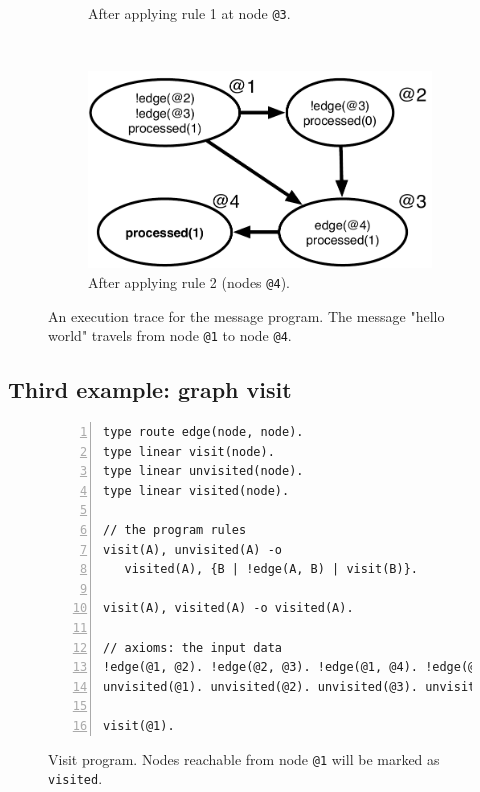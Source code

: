\begin{figure}[h]
\begin{subfigure}[b]{0.5\textwidth}
                \caption{After applying rule 1 at node \texttt{@3}.}
                \label{fig:message_trace3}
        \end{subfigure}%
        ~
        \begin{subfigure}[b]{0.5\textwidth}
                  \includegraphics[width=\textwidth]{figures/message/message_trace4}
                  \caption{After applying rule 2 (nodes \texttt{@4}).}
                  \label{fig:message_trace4}
          \end{subfigure}
        \caption{An execution trace for the message program. The message "hello
        world" travels from node \texttt{@1} to node \texttt{@4}.}\label{fig:message_trace}
\end{figure}

\subsection{Third example: graph visit}

\begin{figure}[h!]
\scriptsize\begin{Verbatim}[numbers=left]
type route edge(node, node).
type linear visit(node).
type linear unvisited(node).
type linear visited(node).

// the program rules
visit(A), unvisited(A) -o
   visited(A), {B | !edge(A, B) | visit(B)}.

visit(A), visited(A) -o visited(A).

// axioms: the input data
!edge(@1, @2). !edge(@2, @3). !edge(@1, @4). !edge(@2, @4).
unvisited(@1). unvisited(@2). unvisited(@3). unvisited(@4).

visit(@1).
\end{Verbatim}
  \caption{Visit program. Nodes reachable from node \texttt{@1} will be marked
     as \texttt{visited}.}
  \label{code:visit}
\end{figure}
\normalsize

